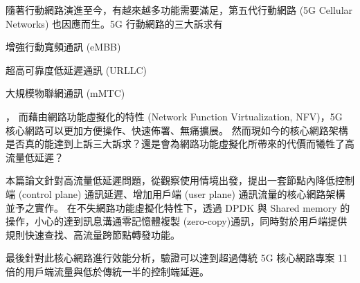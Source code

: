 \begin{abstractzh}

    隨著行動網路演進至今，有越來越多功能需要滿足，第五代行動網路 (5G Cellular Networks) 也因應而生。5G 行動網路的三大訴求有
    \begin{enumerate*}
    \item 增強行動寬頻通訊 (eMBB)
    \item 超高可靠度低延遲通訊 (URLLC)
    \item 大規模物聯網通訊 (mMTC)
    \end{enumerate*}，
    而藉由網路功能虛擬化的特性 (Network Function Virtualization, NFV)，5G 核心網路可以更加方便操作、快速佈署、無痛擴展。
    然而現如今的核心網路架構是否真的能達到上訴三大訴求？還是會為網路功能虛擬化所帶來的代價而犧牲了高流量低延遲？

    本篇論文針對高流量低延遲問題，從觀察使用情境出發，提出一套節點內降低控制端 (control plane) 通訊延遲、增加用戶端 (user plane) 通訊流量的核心網路架構並予之實作。
    在不失網路功能虛擬化特性下，透過 DPDK 與 Shared memory 的操作，小心的達到訊息溝通零記憶體複製 (zero-copy)通訊，同時對於用戶端提供規則快速查找、高流量跨節點轉發功能。

    最後針對此核心網路進行效能分析，驗證可以達到超過傳統 5G 核心網路專案 11 倍的用戶端流量與低於傳統一半的控制端延遲。

\end{abstractzh}

